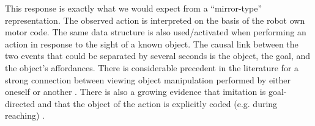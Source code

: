 This response is exactly what we would expect from a ``mirror-type''
representation.  The observed action is interpreted on the basis of
the robot own motor code. The same data structure is also
used/activated when performing an action in response to the sight of a
known object. The causal link between the two events that could be
separated by several seconds is the object, the goal, and the object's
affordances. There is considerable precedent in the literature for a
strong connection between viewing object manipulation performed by
either oneself or another \cite{wohlsclager02human}.  There is also a
growing evidence that imitation is goal-directed
\cite{bekkering-wohlschlager-2000} and that the object of the action
is explicitly coded (e.g. during reaching) \cite{woodward-1998}.

